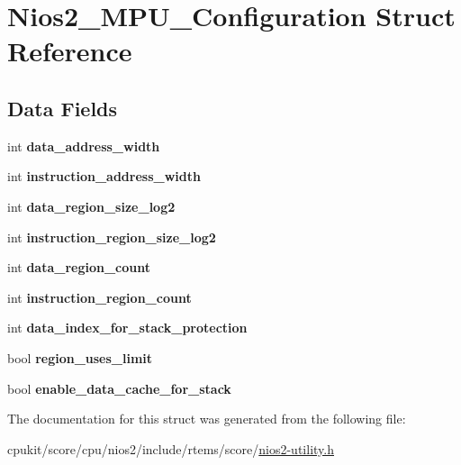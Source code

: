 \hypertarget{structNios2__MPU__Configuration}{}\section{Nios2\+\_\+\+M\+P\+U\+\_\+\+Configuration Struct Reference}
\label{structNios2__MPU__Configuration}
\subsection*{Data Fields}
\begin{DoxyCompactItemize}
\item 
\mbox{\label{structNios2__MPU__Configuration_a8d4377d2ffaf77e838b7c2437ba01072}} 
int {\bfseries data\+\_\+address\+\_\+width}
\item 
\mbox{\label{structNios2__MPU__Configuration_af53d2017628d22d5f22aa31c16c8f8db}} 
int {\bfseries instruction\+\_\+address\+\_\+width}
\item 
\mbox{\label{structNios2__MPU__Configuration_a7e7c4ac8137f966d86a04ad097eff4f6}} 
int {\bfseries data\+\_\+region\+\_\+size\+\_\+log2}
\item 
\mbox{\label{structNios2__MPU__Configuration_a4bd47e496edeaf0f613d6a2396ca2635}} 
int {\bfseries instruction\+\_\+region\+\_\+size\+\_\+log2}
\item 
\mbox{\label{structNios2__MPU__Configuration_a2be34175d53cd780ead17c45e3900f3d}} 
int {\bfseries data\+\_\+region\+\_\+count}
\item 
\mbox{\label{structNios2__MPU__Configuration_acd0d2c8182d944ff914c8d4168e444d1}} 
int {\bfseries instruction\+\_\+region\+\_\+count}
\item 
\mbox{\label{structNios2__MPU__Configuration_a9440ae3d034a67b85a95cba2899d5913}} 
int {\bfseries data\+\_\+index\+\_\+for\+\_\+stack\+\_\+protection}
\item 
\mbox{\label{structNios2__MPU__Configuration_a0c31464a0c30908d4bbcc9ee4af0d11e}} 
bool {\bfseries region\+\_\+uses\+\_\+limit}
\item 
\mbox{\label{structNios2__MPU__Configuration_a58766b087fe1b9a2484e972f94f9833f}} 
bool {\bfseries enable\+\_\+data\+\_\+cache\+\_\+for\+\_\+stack}
\end{DoxyCompactItemize}


The documentation for this struct was generated from the following file\+:\begin{DoxyCompactItemize}
\item 
cpukit/score/cpu/nios2/include/rtems/score/\mbox{\hyperlink{nios2-utility_8h}{nios2-\/utility.\+h}}\end{DoxyCompactItemize}
